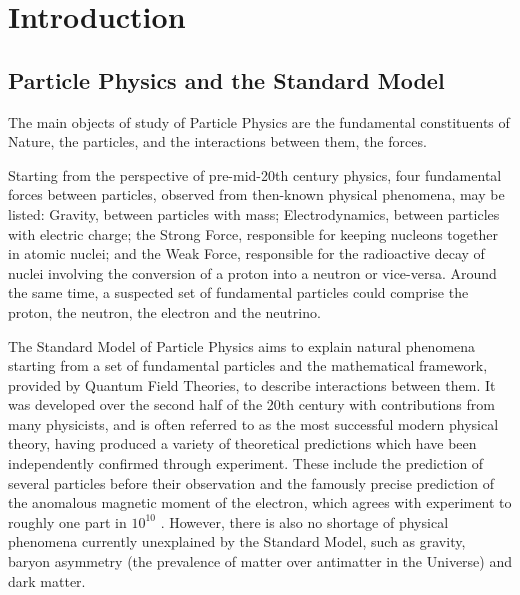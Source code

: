 \chapter{Introduction}

\section{Particle Physics and the Standard Model}

The main objects of study of Particle Physics are the fundamental constituents of Nature, the particles, and the interactions between them, the forces. 

Starting from the perspective of pre-mid-20th century physics, four fundamental forces between particles, observed from then-known physical phenomena, may be listed: Gravity, between particles with mass; Electrodynamics, between particles with electric charge; the Strong Force, responsible for keeping nucleons together in atomic nuclei; and the Weak Force, responsible for the radioactive decay of nuclei involving the conversion of a proton into a neutron or vice-versa. Around the same time, a suspected set of fundamental particles could comprise the proton, the neutron, the electron and the neutrino. %

The Standard Model of Particle Physics aims to explain natural phenomena starting from a set of fundamental particles and the mathematical framework, provided by Quantum Field Theories, to describe interactions between them. It was developed over the second half of the 20th century with contributions from many physicists, and is often referred to as the most successful modern physical theory, having produced a variety of theoretical predictions which have been independently
confirmed through experiment. These include the prediction of several particles before their observation and the famously precise prediction of the anomalous magnetic moment of the electron, which agrees with experiment to roughly one part in $10^{10}$ \cite{Fan_2023}. 
However, there is also no shortage of physical phenomena currently unexplained by the Standard Model, such as gravity, baryon asymmetry (the prevalence of matter over antimatter in the Universe) and dark matter.%

